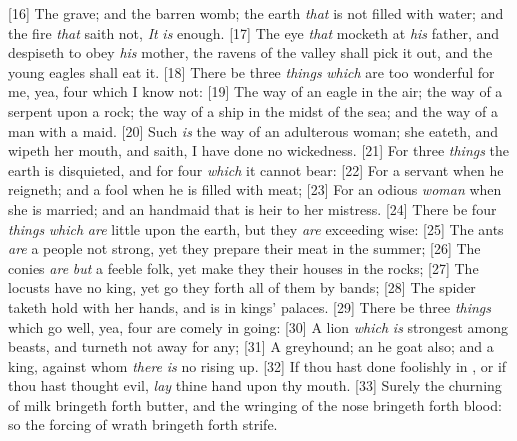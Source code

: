 [16] \textcolor[cmyk]{0.99998,1,0,0}{The grave; and the barren womb; the earth \emph{that} is not filled with water; and the fire \emph{that} saith not, \emph{It} \emph{is} enough.}
[17] \textcolor[cmyk]{0.99998,1,0,0}{The eye \emph{that} mocketh at \emph{his} father, and despiseth to obey \emph{his} mother, the ravens of the valley shall pick it out, and the young eagles shall eat it.}
[18] \textcolor[cmyk]{0.99998,1,0,0}{There be three \emph{things} \emph{which} are too wonderful for me, yea, four which I know not:}
[19] \textcolor[cmyk]{0.99998,1,0,0}{The way of an eagle in the air; the way of a serpent upon a rock; the way of a ship in the midst of the sea; and the way of a man with a maid.}
[20] \textcolor[cmyk]{0.99998,1,0,0}{Such \emph{is} the way of an adulterous woman; she eateth, and wipeth her mouth, and saith, I have done no wickedness.}
[21] \textcolor[cmyk]{0.99998,1,0,0}{For three \emph{things} the earth is disquieted, and for four \emph{which} it cannot bear:}
[22] \textcolor[cmyk]{0.99998,1,0,0}{For a servant when he reigneth; and a fool when he is filled with meat;}
[23] \textcolor[cmyk]{0.99998,1,0,0}{For an odious \emph{woman} when she is married; and an handmaid that is heir to her mistress.}
[24] \textcolor[cmyk]{0.99998,1,0,0}{There be four \emph{things} \emph{which} \emph{are} little upon the earth, but they \emph{are} exceeding wise:}
[25] \textcolor[cmyk]{0.99998,1,0,0}{The ants \emph{are} a people not strong, yet they prepare their meat in the summer;}
[26] \textcolor[cmyk]{0.99998,1,0,0}{The conies \emph{are} \emph{but} a feeble folk, yet make they their houses in the rocks;}
[27] \textcolor[cmyk]{0.99998,1,0,0}{The locusts have no king, yet go they forth all of them by bands;}
[28] \textcolor[cmyk]{0.99998,1,0,0}{The spider taketh hold with her hands, and is in kings' palaces.}
[29] \textcolor[cmyk]{0.99998,1,0,0}{There be three \emph{things} which go well, yea, four are comely in going:}
[30] \textcolor[cmyk]{0.99998,1,0,0}{A lion \emph{which} \emph{is} strongest among beasts, and turneth not away for any;}
[31] \textcolor[cmyk]{0.99998,1,0,0}{A greyhound; an he goat also; and a king, against whom \emph{there} \emph{is} no rising up.}
[32] \textcolor[cmyk]{0.99998,1,0,0}{If thou hast done foolishly in , or if thou hast thought evil, \emph{lay} thine hand upon thy mouth.}
[33] \textcolor[cmyk]{0.99998,1,0,0}{Surely the churning of milk bringeth forth butter, and the wringing of the nose bringeth forth blood: so the forcing of wrath bringeth forth strife.}

